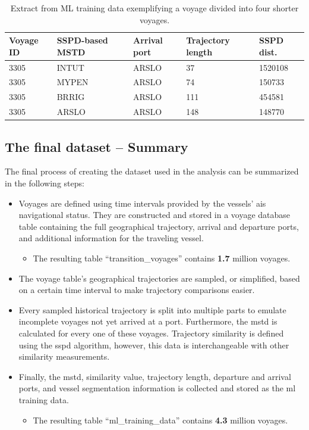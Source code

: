 \begin{table}[htbp]
    \centering
    \small{\begin{tabularx}{0.9\textwidth}{X X X X X}
        \bfseries{Voyage ID} & \bfseries{SSPD-based MSTD} & \bfseries{Arrival port} & \bfseries{Trajectory length} & \bfseries{SSPD dist.} \\ \toprule
        3305 & INTUT & ARSLO & 37 & 1520108 \\ \midrule
        3305 & MYPEN & ARSLO & 74 & 150733 \\ \midrule
        3305 & BRRIG & ARSLO & 111 & 454581 \\ \midrule
        3305 & ARSLO & ARSLO & 148 & 148770 \\ \bottomrule
    \end{tabularx}}
\caption{Extract from ML training data exemplifying a voyage divided into four shorter voyages.}\label{tab:incomplete_voyage}
\end{table}

\subsection{The final dataset -- Summary}

The final process of creating the dataset used in the analysis can be summarized in the following steps:

\begin{itemize}
    \item Voyages are defined using time intervals provided by the vessels' \acrshort{ais} navigational status. They are constructed and stored in a voyage database table containing the full geographical trajectory, arrival and departure ports, and additional information for the traveling vessel.
    \begin{itemize}
        \item The resulting table ``transition\_voyages'' contains \textbf{1.7} million voyages.
    \end{itemize}
    \item The voyage table's geographical trajectories are sampled, or simplified, based on a certain time interval to make trajectory comparisons easier.
    \item Every sampled historical trajectory is split into multiple parts to emulate incomplete voyages not yet arrived at a port. Furthermore, the \acrshort{mstd} is calculated for every one of these voyages. Trajectory similarity is defined using the \acrshort{sspd} algorithm, however, this data is interchangeable with other similarity measurements.
    \item Finally, the \acrshort{mstd}, similarity value, trajectory length, departure and arrival ports, and vessel segmentation information is collected and stored as the \acrshort{ml} training data.
    \begin{itemize}
        \item The resulting table ``ml\_training\_data'' contains \textbf{4.3} million voyages.
    \end{itemize}
\end{itemize}

